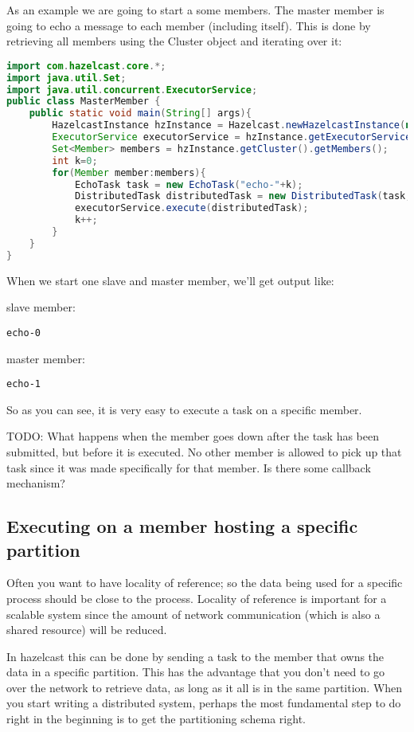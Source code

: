 As an example we are going to start a some members. The master member is going to echo a message to each member (including itself). This is done by retrieving all members using the Cluster object and iterating over it:
\begin{lstlisting}[language=java]
import com.hazelcast.core.*;
import java.util.Set;
import java.util.concurrent.ExecutorService;
public class MasterMember {
    public static void main(String[] args){
        HazelcastInstance hzInstance = Hazelcast.newHazelcastInstance(null);
        ExecutorService executorService = hzInstance.getExecutorService();
        Set<Member> members = hzInstance.getCluster().getMembers();
        int k=0;
        for(Member member:members){
            EchoTask task = new EchoTask("echo-"+k);
            DistributedTask distributedTask = new DistributedTask(task, member);
            executorService.execute(distributedTask);
            k++;
        }
    }
}
\end{lstlisting}
When we start one slave and master member, we'll get output like:

slave member:
\begin{lstlisting}
echo-0
\end{lstlisting}
master member:
\begin{lstlisting}
echo-1
\end{lstlisting}
So as you can see, it is very easy to execute a task on a specific member.

TODO: What happens when the member goes down after the task has been submitted, but before it is executed. No other member is allowed to pick up that task since it was made specifically for that member. Is there some callback mechanism?

\subsection{Executing on a member hosting a specific partition}
Often you want to have locality of reference; so the data being used for a specific process should be close to the process. Locality of reference is important for a scalable system since the amount of network communication (which is also a shared resource) will be reduced.

In hazelcast this can be done by sending a task to the member that owns the data in a specific partition. This has the advantage that you don't need to go over the network to retrieve data, as long as it all is in the same partition. When you start writing a distributed system, perhaps the most fundamental step to do right in the beginning is to get the partitioning schema right.

